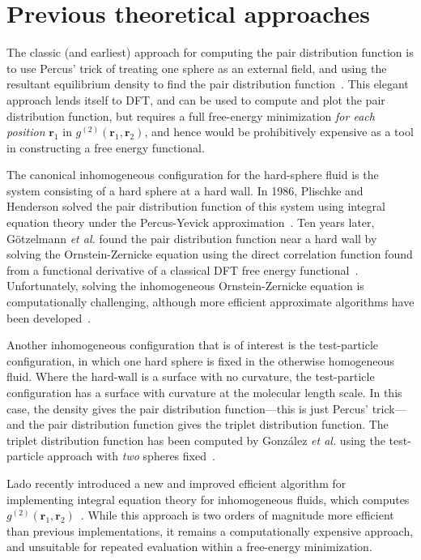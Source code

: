 \documentclass[letterpaper,twocolumn,amsmath,amssymb,pre,aps,10pt]{revtex4-1}
\newcommand{\rr}{\textbf{r}}
\begin{document}
\section{Previous theoretical approaches}

The classic (and earliest) approach for computing the pair
distribution function is to use Percus' trick of treating one sphere
as an external field, and using the resultant equilibrium density to
find the pair distribution function~\cite{hansen2006theory}.  This
elegant approach lends itself to DFT, and can be used to compute and
plot the pair distribution function, but requires a full free-energy
minimization \emph{for each position} $\rr_1$ in
$g^{(2)}(\rr_1,\rr_2)$, and hence would be prohibitively expensive as
a tool in constructing a free energy functional.

The canonical inhomogeneous configuration for the hard-sphere fluid is
the system consisting of a hard sphere at a hard wall.  In 1986,
Plischke and Henderson solved the pair distribution function of this
system using integral equation theory under the Percus-Yevick
approximation~\cite{plischke1986pair}.  Ten years later,
G{\"o}tzelmann \emph{et al.} found the pair distribution function near
a hard wall by solving the Ornstein-Zernicke equation using the direct
correlation function found from a functional derivative of a classical
DFT free energy functional~\cite{gotzelmann1996structure}.
Unfortunately, solving the inhomogeneous Ornstein-Zernicke equation is
computationally challenging, although more efficient approximate
algorithms have been developed~\cite{paul2003variational}.

Another inhomogeneous configuration that is of interest is the
test-particle configuration, in which one hard sphere is fixed in the
otherwise homogeneous fluid.  Where the hard-wall is a surface with no
curvature, the test-particle configuration has a surface with
curvature at the molecular length scale.  In this case, the density
gives the pair distribution function---this is just Percus'
trick---and the pair distribution function gives the triplet
distribution function.  The triplet distribution function has been computed
by Gonz\'alez \emph{et al.} using the test-particle approach with
\emph{two} spheres fixed~\cite{gonzalez1999test}.

Lado recently introduced a new and improved efficient algorithm for
implementing integral equation theory for inhomogeneous fluids, which
computes $g^{(2)}(\rr_1,\rr_2)$~\cite{lado2009efficient}.  While this
approach is two orders of magnitude more efficient than previous
implementations, it remains a computationally expensive approach, and
unsuitable for repeated evaluation within a free-energy minimization.
\end{document}
